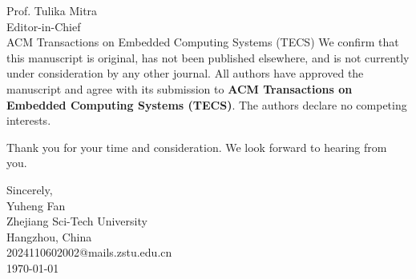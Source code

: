 \documentclass[11pt]{letter}
\makeatletter
\newcommand{\AuthorName}{Yuheng Fan}
\newcommand{\AuthorAffiliation}{Zhejiang Sci-Tech University}
\newcommand{\AuthorAddress}{Hangzhou, China}
\newcommand{\AuthorEmail}{2024110602002@mails.zstu.edu.cn}
\newcommand{\SubmissionDate}{\today}
\newcommand{\EditorName}{Prof. Tulika Mitra}
\newcommand{\EditorTitle}{Editor-in-Chief}
\newcommand{\JournalName}{ACM Transactions on Embedded Computing Systems (TECS)}
\makeatother
\begin{document}
\begin{letter}{\EditorName \\ \EditorTitle \\ \JournalName}
We confirm that this manuscript is original, has not been published elsewhere, and is not currently under consideration by any other journal. All authors have approved the manuscript and agree with its submission to \textbf{\JournalName}. The authors declare no competing interests.

Thank you for your time and consideration. We look forward to hearing from you.

\closing{Sincerely,\\
\vspace{1cm}
\AuthorName \\
\AuthorAffiliation \\
\AuthorAddress \\
\AuthorEmail \\
\SubmissionDate}

\end{letter}
\end{document}
